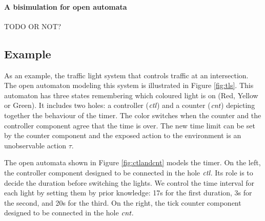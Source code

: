 \documentclass[runningheads]{llncs}
\newcommand{\symb}[1]{\makebox{\it #1}}
\begin{document}
\paragraph{A bisimulation for open automata}

TODO OR NOT?

\subsection{Example}

As an example, the traffic light system  that controls  
 traffic at an intersection. The open automaton  
modeling this system  is illustrated in  Figure \ref{fig:tls}. This automaton has three states  remembering which coloured light
is on (Red, Yellow or Green). It includes two holes: a controller ($\symb{ctl}$) and a counter ($\symb{cnt}$)  depicting together the behaviour of the timer. The color switches when the counter and the controller component agree that the time is over. The new time limit can be set by the counter component and the exposed action to the environment is an unobservable  action $\tau$.

The open automata shown in Figure  \ref{fig:ctlandcnt} models  the timer. On the left, the controller component designed to be connected in the hole $\symb{ctl}$.  Its role is to decide the duration before switching the lights. 
We control the time interval for each light by setting them by prior knowledge:  17s for the first duration, 3s for the second, and 20s for the third. On the right, the tick counter component designed to be connected in the hole $\symb{cnt}$.                                                                                                                                     
\end{document}

